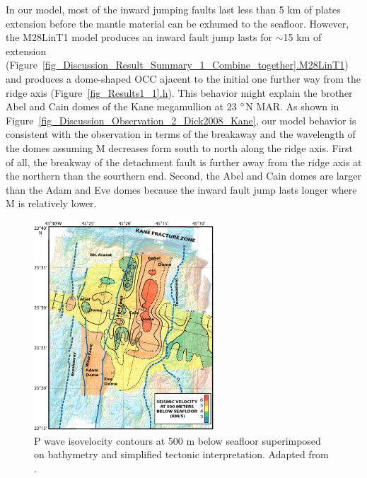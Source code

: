 In our model, most of the inward jumping faults last less than 5 km of plates extension before the mantle material can be exhumed to the seafloor. However, the M28LinT1 model produces an inward fault jump lasts for $\sim$15 km of extension (Figure~\hyperref[fig_Discussion_Result_Summary_1_Combine_together]{\ref{fig_Discussion_Result_Summary_1_Combine_together}.M28LinT1}) and produces a dome-shaped OCC ajacent to the initial one further way from the ridge axis (Figure~\hyperref[fig_Results1_1]{\ref{fig_Results1_1}.h}). This behavior might explain the brother Abel and Cain domes of the Kane megamullion at 23 $\degree$N MAR. As shown in Figure~\hyperref[fig_Discussion_Observation_2_Dick2008_Kane]{\ref{fig_Discussion_Observation_2_Dick2008_Kane}}, our model behavior is consistent with the observation in terms of the breakaway and the wavelength of the domes assuming M decreases form south to north along the ridge axis. First of all, the breakway of the detachment fault is further away from the ridge axis at the northern than the sourthern end. Second, the Abel and Cain domes are larger than the Adam and Eve domes because the inward fault jump lasts longer where M is relatively lower.    

\begin{figure}[h]
 \centering
  \includegraphics[width=0.6\textwidth]{./Figures/fig_Discussion_Observation_1_Xu2009_SeismicV_Kane.eps}
 \caption{P wave isovelocity contours at 500 m below seafloor superimposed on bathymetry and simplified tectonic interpretation. Adapted from \citep{Xu2009}.}
 \label{fig_Discussion_Observation_1_Xu2009_SeismicV_Kane}
\end{figure}

